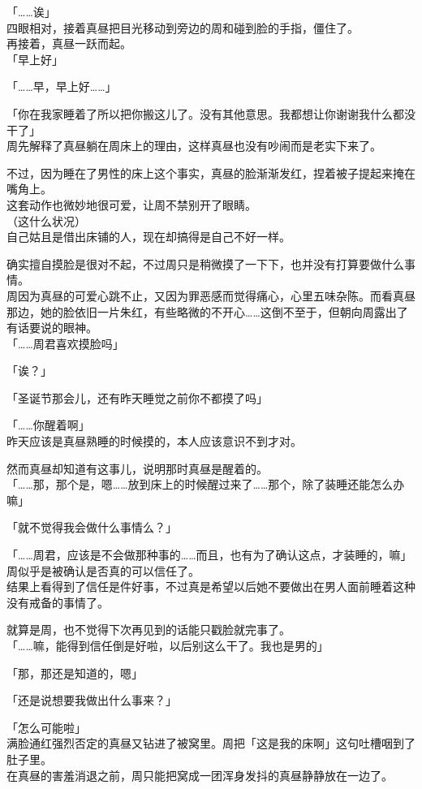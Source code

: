 「……诶」\\

四眼相对，接着真昼把目光移动到旁边的周和碰到脸的手指，僵住了。\\

再接着，真昼一跃而起。\\

「早上好」

「……早，早上好……」

「你在我家睡着了所以把你搬这儿了。没有其他意思。我都想让你谢谢我什么都没干了」\\

周先解释了真昼躺在周床上的理由，这样真昼也没有吵闹而是老实下来了。

不过，因为睡在了男性的床上这个事实，真昼的脸渐渐发红，捏着被子提起来掩在嘴角上。\\

这套动作也微妙地很可爱，让周不禁别开了眼睛。\\

（这什么状况）\\

自己姑且是借出床铺的人，现在却搞得是自己不好一样。

确实擅自摸脸是很对不起，不过周只是稍微摸了一下下，也并没有打算要做什么事情。\\

周因为真昼的可爱心跳不止，又因为罪恶感而觉得痛心，心里五味杂陈。而看真昼那边，她的脸依旧一片朱红，有些略微的不开心……这倒不至于，但朝向周露出了有话要说的眼神。\\

「……周君喜欢摸脸吗」

「诶？」

「圣诞节那会儿，还有昨天睡觉之前你不都摸了吗」

「……你醒着啊」\\

昨天应该是真昼熟睡的时候摸的，本人应该意识不到才对。

然而真昼却知道有这事儿，说明那时真昼是醒着的。\\

「……那，那个是，嗯……放到床上的时候醒过来了……那个，除了装睡还能怎么办嘛」

「就不觉得我会做什么事情么？」

「……周君，应该是不会做那种事的……而且，也有为了确认这点，才装睡的，嘛」\\

周似乎是被确认是否真的可以信任了。\\

结果上看得到了信任是件好事，不过真是希望以后她不要做出在男人面前睡着这种没有戒备的事情了。

就算是周，也不觉得下次再见到的话能只戳脸就完事了。\\

「……嘛，能得到信任倒是好啦，以后别这么干了。我也是男的」

「那，那还是知道的，嗯」

「还是说想要我做出什么事来？」

「怎么可能啦」\\

满脸通红强烈否定的真昼又钻进了被窝里。周把「这是我的床啊」这句吐槽咽到了肚子里。\\

在真昼的害羞消退之前，周只能把窝成一团浑身发抖的真昼静静放在一边了。
